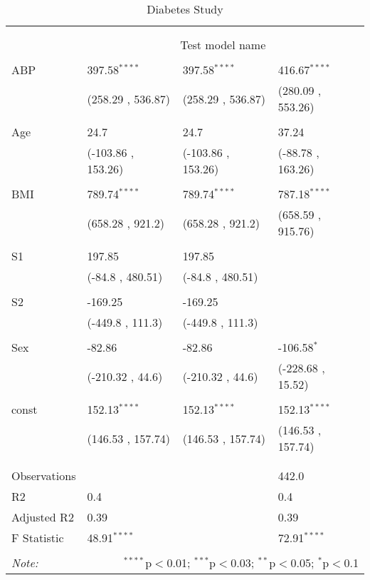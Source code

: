 \begin{table}[!htbp] \centering
  \caption{Diabetes Study}
  \label{}
\begin{tabularx}{\textwidth}{lXXX}
\\[-1.8ex]\hline
\hline \\[-1.8ex]
& \multicolumn{3}{c}{\textit{}} \
\cr \cline{3-4}
\\[-1.8ex] & \multicolumn{3}{c}{Test model name} \\\hline \\[-1.8ex]
 ABP & 397.58$^{****}$ & 397.58$^{****}$ & 416.67$^{****}$ \\
  & (258.29 , 536.87) & (258.29 , 536.87) & (280.09 , 553.26) \\
  & & & \\
 Age & 24.7$^{}$ & 24.7$^{}$ & 37.24$^{}$ \\
  & (-103.86 , 153.26) & (-103.86 , 153.26) & (-88.78 , 163.26) \\
  & & & \\
 BMI & 789.74$^{****}$ & 789.74$^{****}$ & 787.18$^{****}$ \\
  & (658.28 , 921.2) & (658.28 , 921.2) & (658.59 , 915.76) \\
  & & & \\
 S1 & 197.85$^{}$ & 197.85$^{}$ & \\
  & (-84.8 , 480.51) & (-84.8 , 480.51) & \\
  & & & \\
 S2 & -169.25$^{}$ & -169.25$^{}$ & \\
  & (-449.8 , 111.3) & (-449.8 , 111.3) & \\
  & & & \\
 Sex & -82.86$^{}$ & -82.86$^{}$ & -106.58$^{*}$ \\
  & (-210.32 , 44.6) & (-210.32 , 44.6) & (-228.68 , 15.52) \\
  & & & \\
 const & 152.13$^{****}$ & 152.13$^{****}$ & 152.13$^{****}$ \\
  & (146.53 , 157.74) & (146.53 , 157.74) & (146.53 , 157.74) \\
  & & & \\
\hline \\[-1.8ex]
 Observations &   &   & 442.0 \\
 R${2}$ & 0.4 &   & 0.4 \\
 Adjusted R${2}$ & 0.39 &   & 0.39 \\
 F Statistic & 48.91$^{****}$  &     & 72.91$^{****}$  \\
\hline
\hline \\[-1.8ex]
\textit{Note:} & \multicolumn{3}{r}{$^{****}$p$<$0.01; $^{***}$p$<$0.03; $^{**}$p$<$0.05; $^{*}$p$<$0.1} \\
\end{tabularx}
\end{table}